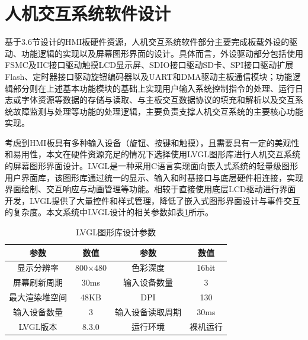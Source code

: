 \section{人机交互系统软件设计}
基于3.6节设计的HMI板硬件资源，人机交互系统软件部分主要完成板载外设的驱动、功能逻辑的实现以及屏幕图形界面的设计。具体而言，外设驱动部分包括使用FSMC及IIC接口驱动触摸LCD显示屏、SDIO接口驱动SD卡、SPI接口驱动扩展Flash、定时器接口驱动旋钮编码器以及UART和DMA驱动主板通信模块；功能逻辑部分则在上述基本功能模块的基础上实现用户输入系统控制指令的处理、运行日志或字体资源等数据的存储与读取、与主板交互数据协议的填充和解析以及交互系统故障监测与处理等功能的处理逻辑，主要负责支撑人机交互系统的主要核心功能实现。

考虑到HMI板具有多种输入设备（旋钮、按键和触摸），且需要具有一定的美观性和易用性，本文在硬件资源充足的情况下选择使用LVGL图形库进行人机交互系统的屏幕图形界面设计。LVGL是一种采用C语言实现面向嵌入式系统的轻量级图形用户界面库，该图形库通过统一的显示、输入和时基接口与底层硬件相连接，实现界面绘制、交互响应与动画管理等功能。相较于直接使用底层LCD驱动进行界面开发，LVGL提供了大量控件和样式管理，降低了嵌入式图形界面设计与事件交互的复杂度。本文系统中LVGL设计的相关参数如表\ref{lvgl_param}所示。
\begin{table}[htbp]
	\caption{\label{lvgl_param}LVGL图形库设计参数}
	\centering
	\small
	\setlength{\tabcolsep}{20pt}
	\begin{tabular}{c c c c}
		\hline
		参数      & 数值      & 参数       & 数值    \\
		\hline
		显示分辨率   & 800×480 & 色彩深度     & 16bit \\
		屏幕刷新周期  & 30ms    & 输入设备数量   & 3     \\
		最大渲染堆空间 & 48KB    & DPI      & 130   \\
		输入设备数量  & 3       & 输入设备读取周期 & 30ms  \\
		LVGL版本  & 8.3.0   & 运行环境     & 裸机运行  \\
		\hline
	\end{tabular}
\end{table}

